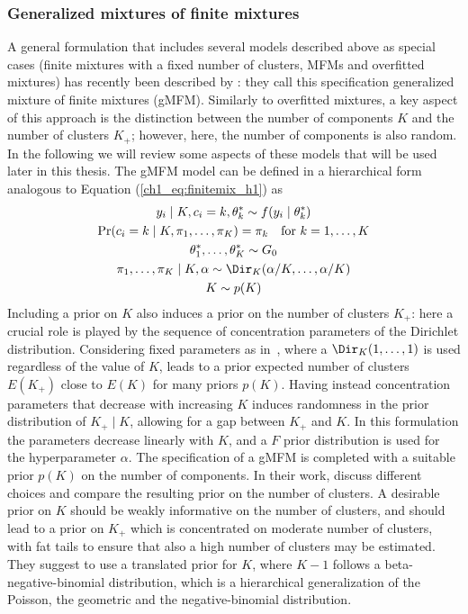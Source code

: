 \subsubsection*{Generalized mixtures of finite mixtures}
A general formulation that includes several models described above as special cases (finite mixtures with a fixed number of clusters, MFMs and overfitted mixtures) has recently been described by \textcite{fruhwirthschnatter2020}: they call this specification generalized mixture of finite mixtures (gMFM). Similarly to overfitted mixtures, a key aspect of this approach is the distinction between the number of components $K$ and the number of clusters $K_+$; however, here, the number of components is also random. 
In the following we will review some aspects of these models that will be used later in this thesis.
The gMFM model can be defined in a hierarchical form analogous to Equation (\ref{ch1_eq:finitemix_h1}) as
\begin{equation*}
\begin{gathered}
y_i \mid K, c_i = k, \theta^*_k \sim f(y_i\mid\theta^*_k)\\
\Pr(c_i = k \mid K, \pi_1,\dots,\pi_K) = \pi_k \quad \text{for } k = 1,\dots,K\\ 
\theta^*_1,\dots,\theta^*_K \sim G_0\\
\pi_1,\dots,\pi_K \mid K, \alpha \sim \Dir_K(\alpha / K, \dots, \alpha / K)\\
K \sim p(K)
\end{gathered}
\label{ch1_eq:gMFM}
\end{equation*}
Including a prior on $K$ also induces a prior on the number of clusters $K_+$: here a crucial role is played by the sequence of concentration parameters of the Dirichlet distribution. Considering fixed parameters as in~\textcite{miller2018}, where a $\Dir_K(1,\dots,1)$ is used regardless of the value of $K$, leads to a prior expected number of clusters $E(K_+)$ close to $E(K)$ for many priors $p(K)$. Having instead concentration parameters that decrease with increasing $K$ induces randomness in the prior distribution of $K_+\mid K$, allowing for a gap between $K_+$ and $K$. In this formulation the parameters decrease linearly with $K$, and a $F$ prior distribution is used for the hyperparameter $\alpha$.
The specification of a gMFM is completed with a suitable prior $p(K)$ on the number of components. In their work, \textcite{fruhwirthschnatter2020} discuss different choices and compare the resulting prior on the number of clusters. 
A desirable prior on $K$ should be weakly informative on the number of clusters, and should lead to a prior on $K_+$ which is concentrated on moderate number of clusters, with fat tails to ensure that also a high number of clusters may be estimated. They suggest to use a translated prior for $K$, where $K-1$ follows a beta-negative-binomial distribution, which is a hierarchical generalization of the Poisson, the geometric and the negative-binomial distribution.

